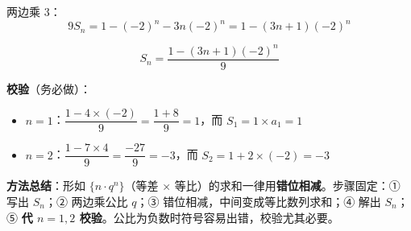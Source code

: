 \begin{answer}
两边乘 $3$：
\nopagebreak[4]
\[9S_n=1-(-2)^{n}-3n(-2)^{n}=1-(3n+1)(-2)^{n}\]

\nopagebreak[4]
\[\boxed{S_n=\frac{1-(3n+1)(-2)^{n}}9}\]

\textbf{校验}（务必做）：
\begin{itemize}
\item $n=1$：$\dfrac{1-4\times(-2)}9=\dfrac{1+8}9=1$，而 $S_1=1\times a_1=1$ 
\item $n=2$：$\dfrac{1-7\times4}9=\dfrac{-27}9=-3$，而 $S_2=1+2\times(-2)=-3$ 
\end{itemize}

\begin{gktip}
\textbf{方法总结}：形如 $\{n\cdot q^{n}\}$（等差 × 等比）的求和一律用\textbf{错位相减}。步骤固定：① 写出 $S_n$；② 两边乘公比 $q$；③ 错位相减，中间变成等比数列求和；④ 解出 $S_n$；⑤ \textbf{代 $n=1,2$ 校验}。公比为负数时符号容易出错，校验尤其必要。
\end{gktip}



\par\medskip

\end{answer}
